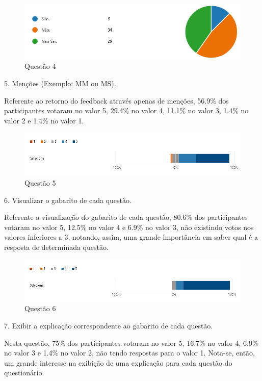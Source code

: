 \begin{figure}[H]
\centering
\includegraphics[scale=0.6]{figuras/4.png}
\caption{Questão 4}
\end{figure}

5. Menções (Exemplo: MM ou MS).

Referente ao retorno do feedback através apenas de menções, 56.9\% dos participantes votaram no valor 5, 29.4\% no valor 4, 11.1\% no valor 3, 1.4\% no valor 2 e 1.4\% no valor 1.

\begin{figure}[H]
\centering
\includegraphics[scale=0.6]{figuras/5.png}
\caption{Questão 5}
\end{figure}

6. Visualizar o gabarito de cada questão.

Referente a visualização do gabarito de cada questão, 80.6\% dos participantes votaram no valor 5, 12.5\% no valor 4 e 6.9\% no valor 3, não existindo votos nos valores inferiores a 3, notando, assim, uma grande importância em saber qual é a resposta de determinada questão.

\begin{figure}[H]
\centering
\includegraphics[scale=0.6]{figuras/6.png}
\caption{Questão 6}
\end{figure}

7. Exibir a explicação correspondente ao gabarito de cada questão.

Nesta questão, 75\% dos participantes votaram no valor 5, 16.7\% no valor 4, 6.9\% no valor 3 e 1.4\% no valor 2, não tendo respostas para o valor 1. Nota-se, então, um grande interesse na exibição de uma explicação para cada questão do questionário.

